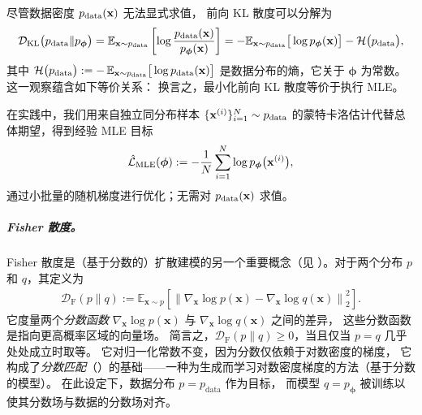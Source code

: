 尽管数据密度 $p_{\mathrm{data}}({\mathbf{x}})$ 无法显式求值，
前向 KL 散度可以分解为
\begin{align*}
\mathcal{D}_{\mathrm{KL}} \big(p_{\mathrm{data}}\|p_{\bm{\phi}}\big)
  = \mathbb{E}_{{\mathbf{x}} \sim p_{\mathrm{data}}} \left[\log \frac{p_{\mathrm{data}}({\mathbf{x}})}{p_{\bm{\phi}}({\mathbf{x}})}\right] = -\mathbb{E}_{{\mathbf{x}} \sim p_{\mathrm{data}}} \big[\log p_{\bm{\phi}}({\mathbf{x}})\big] 
     - \mathcal H \big(p_{\mathrm{data}}\big),
\end{align*}
其中 $\mathcal H \big(p_{\mathrm{data}}\big)
:= -\,\mathbb{E}_{{\mathbf{x}} \sim p_{\mathrm{data}}} \big[\log p_{\mathrm{data}}({\mathbf{x}})\big]$
是数据分布的熵，它关于 $\bm{\phi}$ 为常数。
这一观察蕴含如下等价关系：
换言之，最小化前向 KL 散度等价于执行 MLE。

在实践中，我们用来自独立同分布样本 $\{{\mathbf{x}}^{(i)}\}_{i=1}^N \sim p_{\mathrm{data}}$ 的蒙特卡洛估计代替总体期望，得到经验 MLE 目标
\begin{align*}
  \hat{\mathcal{L}}_{\mathrm{MLE}}(\bm{\phi})
  := -\frac{1}{N}\sum_{i=1}^N \log p_{\bm{\phi}} \big({\mathbf{x}}^{(i)}\big),
\end{align*}
通过小批量的随机梯度进行优化；无需对 $p_{\mathrm{data}}({\mathbf{x}})$ 求值。

\subparagraph{Fisher 散度。}Fisher 散度是（基于分数的）扩散建模的另一个重要概念（见 ）。对于两个分布 $p$ 和 $q$，其定义为
\begin{align}\label{eq:fisher}
    \mathcal D_{\mathrm F}(p \|  q)
:=
\mathbb{E}_{\mathbf{x}\sim p} \left[
\left\|\nabla_{\mathbf x}\log p(\mathbf x)-\nabla_{\mathbf x}\log q(\mathbf x)\right\|_2^{2}
\right].
\end{align}
它度量两个\emph{分数函数}
$\nabla_{\mathbf x}\log p(\mathbf x)$ 与 $\nabla_{\mathbf x}\log q(\mathbf x)$ 之间的差异，
这些分数函数是指向更高概率区域的向量场。
简言之，$\mathcal D_{\mathrm F}(p \|  q)\ge 0$，当且仅当 $p=q$ 几乎处处成立时取等。
它对归一化常数不变，因为分数仅依赖于对数密度的梯度，
它构成了\emph{分数匹配}（）的基础——一种为生成而学习对数密度梯度的方法（基于分数的模型）。
在此设定下，数据分布 $p=p_{\mathrm{data}}$ 作为目标，
而模型 $q=p_{\bm{\phi}}$ 被训练以使其分数场与数据的分数场对齐。





